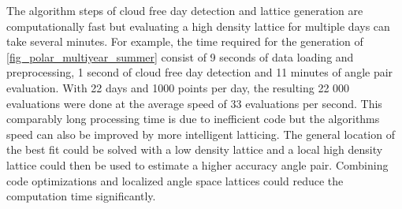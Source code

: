 The algorithm steps of cloud free day detection and lattice generation are computationally fast but evaluating a high density lattice for multiple days can take several minutes. For example, the time required for the generation of \ref{fig_polar_multiyear_summer} consist of 9 seconds of data loading and preprocessing, 1 second of cloud free day detection and 11 minutes of angle pair evaluation. With 22 days and 1000 points per day, the resulting 22 000 evaluations were done at the average speed of 33 evaluations per second. This comparably long processing time is due to inefficient code but the algorithms speed can also be improved by more intelligent latticing. The general location of the best fit could be solved with a low density lattice and a local high density lattice could then be used to estimate a higher accuracy angle pair. Combining code optimizations and localized angle space lattices could reduce the computation time significantly.





















